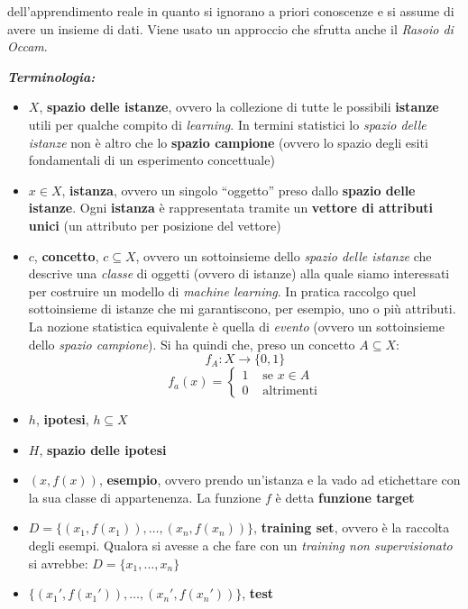 \documentclass[a4paper,12pt, oneside]{book}
\begin{document}
dell'apprendimento reale in quanto si ignorano a priori conoscenze e si assume
di avere un insieme di dati. Viene usato un approccio che sfrutta anche il
\textit{Rasoio di Occam}.
\begin{shaded}
  \textbf\textit{{Terminologia:}}
  \begin{itemize}
    \item $X$, \textbf{spazio delle istanze}, ovvero la collezione di tutte le
    possibili \textbf{istanze} utili per qualche compito di
    \textit{learning}. In termini statistici lo \textit{spazio delle istanze}
    non è altro che lo \textbf{spazio campione} (ovvero lo spazio degli esiti
    fondamentali di un esperimento concettuale)
    \item $x\in X$, \textbf{istanza}, ovvero un singolo ``oggetto'' preso dallo
    \textbf{spazio delle istanze}. Ogni \textbf{istanza} è rappresentata tramite
    un \textbf{vettore di attributi unici} (un attributo per posizione del
    vettore)
    \item $c$, \textbf{concetto}, $c\subseteq X$, ovvero un sottoinsieme dello
    \textit{spazio delle istanze} che descrive una \textit{classe} di oggetti
    (ovvero di istanze) alla quale siamo interessati per costruire un modello di
    \textit{machine learning}. In pratica raccolgo quel sottoinsieme di istanze
    che mi garantiscono, per esempio, uno o più attributi. La nozione statistica
    equivalente è quella di \textit{evento} (ovvero un sottoinsieme dello
    \textit{spazio campione}). Si ha quindi che, preso un concetto $A\subseteq
    X$:
    \[f_A:X\to\{0,1\}\]
    \[f_a(x)=
      \begin{cases}
        1& \mbox{ se } x\in A\\
        0& \mbox{ altrimenti}
      \end{cases}
    \]
    \item $h$, \textbf{ipotesi}, $h\subseteq X$
    \item $H$, \textbf{spazio delle ipotesi}
    \item $(x, f(x))$, \textbf{esempio},
    ovvero prendo un'istanza e la vado ad etichettare con la sua classe di
    appartenenza. La funzione $f$ è detta \textbf{funzione target}
    \item $D=\{(x_1,f(x_1)),\ldots,(x_n,f(x_n))\}$, \textbf{training set},
    ovvero è la raccolta degli esempi. Qualora si avesse a che fare con un 
    \textit{training non supervisionato} si avrebbe:
    $D=\{x_1,\ldots,x_n\}$
    \item $\{(x_1',f(x_1')),\ldots,(x_n',f(x_n'))\}$, \textbf{test}

\end{itemize}
\end{shaded}
\end{document}
